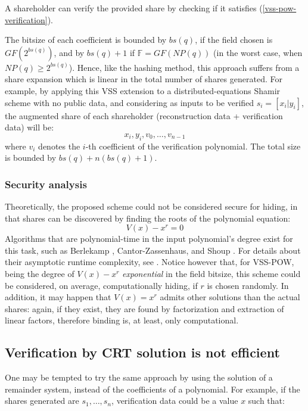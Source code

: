\documentclass[10pt,journal,cspaper,compsoc]{IEEEtran}
\begin{document}
A shareholder can verify the provided share by checking if it satisfies (\ref{vss-pow-verification}).

The bitsize of each coefficient is bounded by $bs(q)$, if the field chosen is $GF(2^{bs(q)})$, and by $bs(q)+1$ if $\mathbb{F}=GF(NP(q))$ (in the worst case, when $NP(q) \geq 2^{bs(q)}$).
Hence, like the hashing method, this approach suffers from a share expansion which is linear in the total number of shares generated. For example, by applying this VSS extension to a distributed-equations Shamir scheme with no public data, and considering as inputs to be verified $s_i = [x_i|y_i]$, the augmented share of each shareholder (reconstruction data + verification data) will be:
$$ x_i,y_i, v_{0},\ldots,v_{n-1} $$
where $v_i$ denotes the $i$-th coefficient of the verification polynomial. The total size is bounded by $bs(q)+n(bs(q)+1)$.

\subsubsection{Security analysis}
Theoretically, the proposed scheme could not be considered secure for hiding, in that shares can be discovered by finding the roots of the polynomial equation:
\begin{equation}
V(x)-x^r = 0
\end{equation}
Algorithms that are polynomial-time in the input polynomial's degree exist for this task, such as Berlekamp \cite{Berlekamp:1967:FPF}, Cantor-Zassenhaus, and Shoup \cite{Shoup90onthe}. For details about their asymptotic runtime complexity, see \cite{Shoup93factoringpolynomials}.
Notice however that, for VSS-POW, being the degree of $V(x)-x^r$ \emph{exponential} in the field bitsize, this scheme could be considered, on average, computationally hiding, if $r$ is chosen randomly.
In addition, it may happen that $V(x)=x^r$ admits other solutions than the actual shares: again, if they exist, they are found by factorization and extraction of linear factors, therefore binding is, at least, only computational.




\subsection{Verification by CRT solution is not efficient}
One may be tempted to try the same approach by using the solution of a remainder system, instead of the coefficients of a polynomial. For example, if the shares generated are $s_1,\ldots,s_n$, verification data could be a value $x$ such that:
\end{document}
